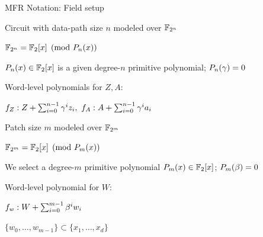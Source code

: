 
\begin{frame}{\large MFR Notation: Field setup}
\bi
	\item Circuit with data-path size $n$ modeled over ${\mathbb{F}}_{2^n}$
	\bi
		\pause
		\item ${\mathbb{F}}_{2^n} = {\mathbb{F}}_{2}[x]\pmod{P_n(x)}$
		\bi
			\item $P_n(x) \in {\mathbb{F}}_2[x]$ is a given degree-$n$ primitive polynomial; $P_n(\gamma) =0$ 
		\ei
		\pause
		\item  Word-level polynomials for $Z,A$:
		\bi
			\item $f_Z: Z + \sum_{i=0}^{n-1}\gamma^iz_i,~f_A: A + \sum_{i=0}^{n-1}\gamma^ia_i$ 
		\ei
	\ei 
	\vspace{0.1in}
	\vspace{0.1in}
	\pause
	\item Patch size $m$ modeled over ${\mathbb{F}}_{2^m}$
	\bi
		\pause
		\item ${\mathbb{F}}_{2^m} = {\mathbb{F}}_{2}[x]\pmod{P_m(x)}$
		\bi
			\item We select a degree-$m$ primitive polynomial $P_m(x)\in {\mathbb{F}}_2[x]$; $P_m(\beta) =0$ 
		\ei
		\pause
		\item  Word-level polynomial for $W$:
		\bi
			\item $f_w: W + \sum_{i=0}^{m-1}\beta^iw_i$
			\item $\{w_0,\dots,w_{m-1}\} \subset \{x_1,\dots,x_d\}$
		\ei
	\ei
\ei
\end{frame}

